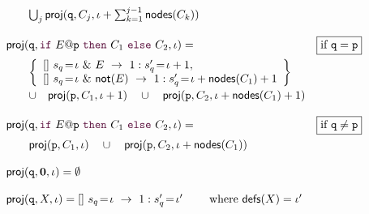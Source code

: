 \begin{definition}
\begin{displaymath}
\begin{array}{lr}
          \qquad\bigcup_{j} \proj (\role q, C_j, \iota+\sum_{k=1}^{j-1}\mathsf{nodes}({C_k}))

          \\\\

          \proj (\role q,\ifTE {E}{p}{C_1}{C_2}, \iota) = 
          &  \boxed{\text{if }\role q=\role p}\\[2mm]
          \qquad\left\{ 
          \begin{array}{lll}
            \commandBase {} {s_{q}\!=\! \iota\ \&\ E}{\ 1: s'_{q}\!=\! \iota+1},\\ 
            \commandBase {} {s_{q}\!=\! \iota\ \&\ \mathsf{not}(E)}
            {\ 1: s'_{q}\!=\! \iota+\mathsf{nodes}(C_1)+1}
          \end{array}
          \right\}
          \\[3mm]
          \qquad\cup\quad \proj (\role{p}, C_1, \iota+1)
          \quad\cup\quad
          \proj (\role{p}, C_2, \iota+\mathsf{nodes}(C_1)+1)
          \\\\

          \proj (\role q,\ifTE {E}{p}{C_1}{C_2}, \iota) = 
          &  \boxed{\text{if }\role q\neq\role p}\\[2mm]


          \qquad \proj (\role{p}, C_1, \iota)
          \quad\cup\quad
          \proj (\role{p}, C_2, \iota+\mathsf{nodes}(C_1))



          \\\\

          \proj (\role q,\CEnd, \iota) = \emptyset

          \\\\

          \proj (\role q, X, \iota) = 
          \commandBase {} {s_{q}\!=\! \iota}{\ 1: s'_{q}\!=\! \iota'}
          \qquad\text{ where } \textsf{defs}(X) = \iota'

        \end{array}
      \end{displaymath}
    \end{definition}
